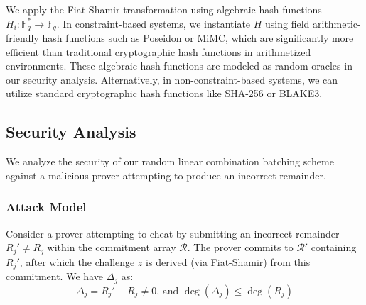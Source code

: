 We apply the Fiat-Shamir \cite{fiatshamir} transformation using algebraic hash functions $H_i: \mathbb{F}_q^* \to \mathbb{F}_q$. In constraint-based systems, we instantiate $H$ using field arithmetic-friendly hash functions such as Poseidon\cite{poseidon} or MiMC\cite{mimc}, which are significantly more efficient than traditional cryptographic hash functions in arithmetized environments. These algebraic hash functions are modeled as random oracles in our security analysis. Alternatively, in non-constraint-based systems, we can utilize standard cryptographic hash functions like SHA-256 or BLAKE3\cite{blake3}.


\subsection{Security Analysis}

We analyze the security of our random linear combination batching scheme against a malicious prover attempting to produce an incorrect remainder.

\subsubsection{Attack Model}

Consider a prover attempting to cheat by submitting an incorrect remainder $R_j' \neq R_j$ within the commitment array $\mathcal{R}$. The prover commits to $\mathcal{R}'$ containing $R_j'$, after which the challenge $z$ is derived (via Fiat-Shamir) from this commitment. We have $\Delta_j$ as:
$$\Delta_j = R_j' - R_j \neq 0 \text{, and } \deg(\Delta_j) \leq \deg(R_j)$$

